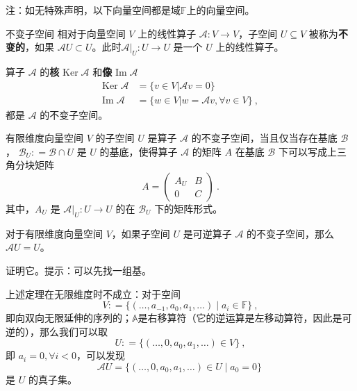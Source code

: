 

注：如无特殊声明，以下向量空间都是域$\mathbb{F}$上的向量空间。

\begin{definition}{不变子空间}
相对于向量空间 $V$ 上的线性算子 $\mathcal{A}: V \rightarrow V$，子空间 $U \subseteq V$ 被称为\textbf{不变的}，如果 $\mathcal{A} U \subset U$。此时$\mathcal{A}|_U: U \to U$ 是一个 $U$ 上的线性算子。
\end{definition}

\begin{example}{}
算子 $\mathcal{A}$ 的\textbf{核} $\mathrm{Ker}\;\mathcal A$ 和\textbf{像} $\mathrm{Im}\;\mathcal{A}$
\begin{equation}\label{eq_InvSP_3}
\begin{aligned}
\mathrm{Ker}\;\mathcal{A}&=\{ v\in V|\mathcal{A} v= 0\}\\
\mathrm{Im}\;\mathcal{A}&=\{ w\in V| w=\mathcal{A} v,\forall v\in V\}~,
\end{aligned}
\end{equation}
都是 $\mathcal A$ 的不变子空间。
\end{example}

\begin{theorem}{}
有限维度向量空间 $V$ 的子空间 $U$ 是算子 $\mathcal{A}$ 的不变子空间，当且仅当存在基底 $\mathcal{B}$， $\mathcal{B}_U: = \mathcal{B} \cap U$ 是 $U$ 的基底，使得算子 $\mathcal{A}$ 的矩阵 $A$ 在基底 $\mathcal{B}$ 下可以写成上三角分块矩阵
\begin{equation}
A = \begin{pmatrix}
A_U & B\\
0 & C
\end{pmatrix}~.
\end{equation}
其中，$A_U$ 是 $\mathcal{A}|_{U}: U \to U$ 的在 $\mathcal{B}_U$ 下的矩阵形式。
\end{theorem}

\begin{theorem}{}
对于有限维度向量空间 $V$，如果子空间 $U$ 是可逆算子 $\mathcal{A}$ 的不变子空间，那么 $\mathcal{A} U = U$。
\end{theorem}
\begin{exercise}{}
证明它。提示：可以先找一组基。
\end{exercise}

\begin{example}{}
上述定理在无限维度时不成立：对于空间
$$
V: = \{ (\dots, a_{-1}, a_0, a_1, \dots) \mid a_i \in \mathbb{F}\}~,
$$
即向双向无限延伸的序列的；$\mathbb{A}$是右移算符（它的逆运算是左移动算符，因此是可逆的），那么我们可以取
$$
U: = \{ (\dots, 0, a_0, a_1, \dots) \in V \}~,
$$
即 $a_i = 0, \forall i < 0$，可以发现
$$
\mathcal{A} U = \{ (\dots, 0, a_0, a_1, \dots) \in U \mid a_0 = 0 \}~
$$
是 $U$ 的真子集。
\end{example}

